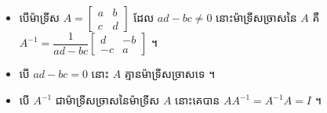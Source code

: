 \begin{formulaBox}[ជាទូទៅ]
\begin{itemize}
  \item បើម៉ាទ្រីស $A = \begin{bmatrix} a & b\\ c & d \end{bmatrix}$ ដែល $ad - bc \ne 0$ នោះម៉ាទ្រីសច្រាសនៃ $A$ គឺ $A^{-1} = \dfrac{1}{ad - bc}\begin{bmatrix} d & -b\\ -c & a \end{bmatrix}$ ។
  \item បើ $ad - bc = 0$ នោះ $A$ គ្មានម៉ាទ្រីសច្រាសទេ ។
  \item បើ $A^{-1}$ ជាម៉ាទ្រីសច្រាសនៃម៉ាទ្រីស $A$ នោះគេបាន $AA^{-1} = A^{-1}A = I$ ។
\end{itemize}
\end{formulaBox}

